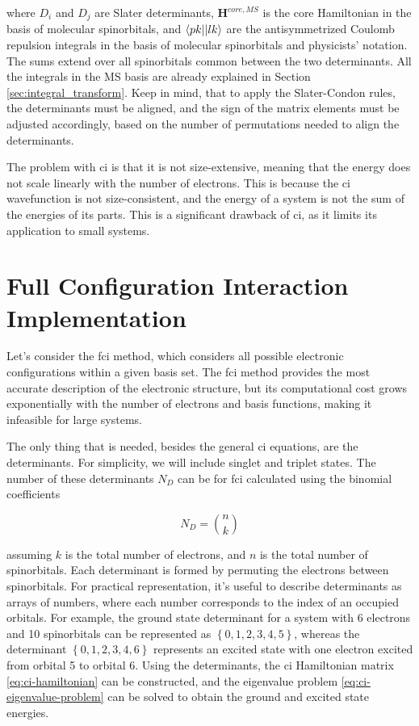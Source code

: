 where \(D_i\) and \(D_j\) are Slater determinants, \(\mathbf{H}^{core,MS}\) is the core Hamiltonian in the basis of molecular spinorbitals, and \(\braket{pk||lk}\) are the antisymmetrized Coulomb repulsion integrals in the basis of molecular spinorbitals and physicists' notation. The sums extend over all spinorbitals common between the two determinants. All the integrals in the MS basis are already explained in Section \ref{sec:integral_transform}. Keep in mind, that to apply the Slater-Condon rules, the determinants must be aligned, and the sign of the matrix elements must be adjusted accordingly, based on the number of permutations needed to align the determinants.

The problem with \acrshort{ci} is that it is not size-extensive, meaning that the energy does not scale linearly with the number of electrons. This is because the \acrshort{ci} wavefunction is not size-consistent, and the energy of a system is not the sum of the energies of its parts. This is a significant drawback of \acrshort{ci}, as it limits its application to small systems.

\section{Full Configuration Interaction Implementation}

Let's consider the \acrshort{fci} method, which considers all possible electronic configurations within a given basis set. The \acrshort{fci} method provides the most accurate description of the electronic structure, but its computational cost grows exponentially with the number of electrons and basis functions, making it infeasible for large systems.

The only thing that is needed, besides the general \acrshort{ci} equations, are the determinants. For simplicity, we will include singlet and triplet states. The number of these determinants \(N_D\) can be for \acrshort{fci} calculated using the binomial coefficients

\begin{equation}
N_D=\binom{n}{k}
\end{equation}

assuming \(k\) is the total number of electrons, and \(n\) is the total number of spinorbitals. Each determinant is formed by permuting the electrons between spinorbitals. For practical representation, it's useful to describe determinants as arrays of numbers, where each number corresponds to the index of an occupied orbitals. For example, the ground state determinant for a system with 6 electrons and 10 spinorbitals can be represented as \(\left\lbrace 0,1,2,3,4,5\right\rbrace\), whereas the determinant \(\left\lbrace 0,1,2,3,4,6\right\rbrace\) represents an excited state with one electron excited from orbital 5 to orbital 6. Using the determinants, the \acrshort{ci} Hamiltonian matrix \eqref{eq:ci-hamiltonian} can be constructed, and the eigenvalue problem \eqref{eq:ci-eigenvalue-problem} can be solved to obtain the ground and excited state energies.

